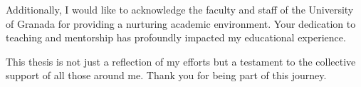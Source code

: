 \textgap

Additionally, I would like to acknowledge the faculty and staff of the University of Granada for providing a nurturing academic environment. Your dedication to teaching and mentorship has profoundly impacted my educational experience.

\textgap

This thesis is not just a reflection of my efforts but a testament to the collective support of all those around me. Thank you for being part of this journey.

\newpage
